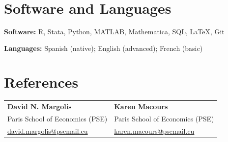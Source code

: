 \documentclass[a4paper,11pt]{article}
\begin{document}
\section{Software and Languages}
\textbf{Software:} R, Stata, Python, MATLAB, Mathematica, SQL, \LaTeX, Git\par\vspace{3pt}
\textbf{Languages:} Spanish (native); English (advanced); French (basic)

\section{References}
\begin{tabularx}{\linewidth}{@{}>{\raggedright\arraybackslash}X>{\raggedright\arraybackslash}X@{}}
\textbf{David N. Margolis} & \textbf{Karen Macours}\\
Paris School of Economics (PSE) & Paris School of Economics (PSE)\\
\href{mailto:david.margolis@psemail.eu}{david.margolis@psemail.eu} & \href{mailto:karen.macours@psemail.eu}{karen.macours@psemail.eu}\\
\end{tabularx}
\end{document}

